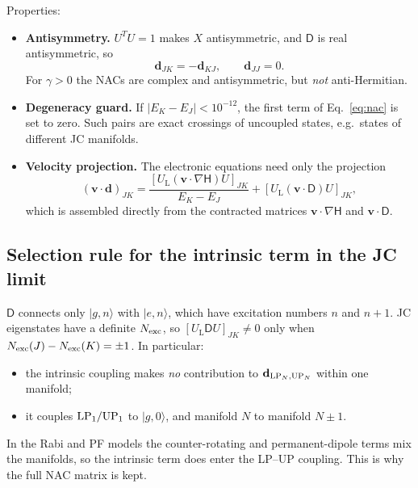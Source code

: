 \documentclass[11pt]{article}
\newcommand{\ket}[1]{\lvert #1 \rangle}
\newcommand{\vv}{\mathbf{v}}
\newcommand{\grad}{\nabla}
\newcommand{\dd}{\mathbf{d}}
\newcommand{\UL}{U_{\mathrm L}}
\newcommand{\Hm}{\mathsf{H}}
\newcommand{\Dm}{\mathsf{D}}
\begin{document}
Properties:
\begin{itemize}
\item \textbf{Antisymmetry.} $U^TU=1$ makes $X$ antisymmetric, and $\Dm$ is real antisymmetric, so
\begin{equation}
\dd_{JK}=-\dd_{KJ},\qquad \dd_{JJ}=0 .
\end{equation}
For $\gamma>0$ the NACs are complex and antisymmetric, but \emph{not} anti-Hermitian.
\item \textbf{Degeneracy guard.} If $|E_K-E_J|<10^{-12}$, the first term of Eq.~\eqref{eq:nac} is set to zero. Such pairs are exact crossings of uncoupled states, e.g.\ states of different JC manifolds.
\item \textbf{Velocity projection.} The electronic equations need only the projection
\begin{equation}
(\vv\cdot\dd)_{JK}=\frac{[\UL(\vv\cdot\grad\Hm)U]_{JK}}{E_K-E_J}+[\UL(\vv\cdot\Dm)U]_{JK},
\label{eq:vd}
\end{equation}
which is assembled directly from the contracted matrices $\vv\cdot\grad\Hm$ and $\vv\cdot\Dm$.
\end{itemize}

\subsection{Selection rule for the intrinsic term in the JC limit}
$\Dm$ connects only $\ket{g,n}$ with $\ket{e,n}$, which have excitation numbers $n$ and $n+1$. JC eigenstates have a definite $N_{\rm exc}$, so $[\UL\Dm U]_{JK}\neq0$ only when $N_{\rm exc}(J)-N_{\rm exc}(K)=\pm1$. In particular:
\begin{itemize}
\item the intrinsic coupling makes \emph{no} contribution to $\dd_{{\rm LP}_N,{\rm UP}_N}$ within one manifold;
\item it couples ${\rm LP}_1/{\rm UP}_1$ to $\ket{g,0}$, and manifold $N$ to manifold $N\pm1$.
\end{itemize}
In the Rabi and PF models the counter-rotating and permanent-dipole terms mix the manifolds, so the intrinsic term does enter the LP--UP coupling. This is why the full NAC matrix is kept.

\end{document}
